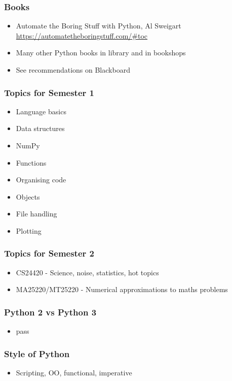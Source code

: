 \documentclass{beamer}
\begin{document}
\begin{frame}
\frametitle{Books}
\begin{itemize}
\item Automate the Boring Stuff with Python, Al Sweigart 
    \url{https://automatetheboringstuff.com/\#toc}
\item Many other Python books in library and in bookshops
\item See recommendations on Blackboard
\end{itemize}
\end{frame}



\begin{frame}
\frametitle{Topics for Semester 1}
\begin{itemize}
\item Language basics
\item Data structures
\item NumPy
\item Functions
\item Organising code
\item Objects
\item File handling
\item Plotting
\end{itemize}
\end{frame}

\begin{frame}
\frametitle{Topics for Semester 2}
\begin{itemize}
\item CS24420 - Science, noise, statistics, hot topics
\item MA25220/MT25220 - Numerical approximations to maths problems
\end{itemize}
\end{frame}

\begin{frame}
\frametitle{Python 2 vs Python 3}
\begin{itemize}
\item pass
\end{itemize}
\end{frame}

\begin{frame}
\frametitle{Style of Python}
\begin{itemize}
\item Scripting, OO, functional, imperative
\end{itemize}
\end{frame}
\end{document}
